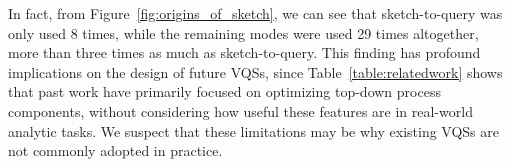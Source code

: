 In fact, from Figure~\ref{fig:origins_of_sketch},
we can see that sketch-to-query was only used
8 times, while the remaining modes were used 29 times altogether,
more than three times as much as sketch-to-query.
This finding has profound implications
on the design of future VQSs, since Table~\ref{table:relatedwork}
shows that past work have primarily focused
on optimizing top-down process components,
without considering how useful these features
are in real-world analytic tasks.
We suspect that these limitations
may be why existing VQSs are not commonly adopted in practice. %


